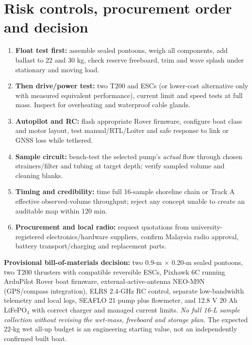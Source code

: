\documentclass[10pt,a4paper]{article}
\begin{document}
\section{Risk controls, procurement order and decision}
\begin{enumerate}[leftmargin=*]
\item \textbf{Float test first:} assemble sealed pontoons, weigh all components, add ballast to 22 and 30 kg, check reserve freeboard, trim and wave splash under stationary and moving load.
\item \textbf{Then drive/power test:} two T200 and ESCs (or lower-cost alternative only with measured equivalent performance), current limit and speed tests at full mass. Inspect for overheating and waterproof cable glands.
\item \textbf{Autopilot and RC:} flash appropriate Rover firmware, configure boat class and motor layout, test manual/RTL/Loiter and safe response to link or GNSS loss while tethered.
\item \textbf{Sample circuit:} bench-test the selected pump's \emph{actual} flow through chosen strainers/filter and tubing at target depth; verify sampled volume and cleaning blanks.
\item \textbf{Timing and credibility:} time full 16-sample shoreline chain or Track A effective observed-volume throughput; reject any concept unable to create an auditable map within 120 min.
\item \textbf{Procurement and local radio:} request quotations from university-registered electronics/hardware suppliers, confirm Malaysia radio approval, battery transport/charging and replacement parts.
\end{enumerate}
\textbf{Provisional bill-of-materials decision:} two 0.9-m $\times$ 0.20-m sealed pontoons, two T200 thrusters with compatible reversible ESCs, Pixhawk 6C running ArduPilot Rover boat firmware, external-active-antenna NEO-M9N (GPS/compass integration), ELRS 2.4-GHz RC control, separate low-bandwidth telemetry and local logs, SEAFLO 21 pump plus flowmeter, and 12.8 V 20 Ah LiFePO$_4$ with correct charger and managed current limits. \emph{No full 16-L sample collection without revising the wet-mass, freeboard and storage plan.} The expected 22-kg wet all-up budget is an engineering starting value, not an independently confirmed built boat.

\printbibliography[title={References and manufacturer documentation}]
\end{document}
